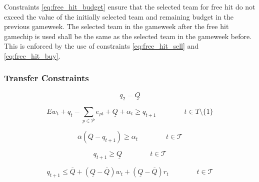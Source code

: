 Constraints \eqref{eq:free_hit_budget} ensure that the selected team for free hit do not exceed the value of the initially selected team and remaining budget in the previous gameweek. The selected team in the gameweek after the free hit gamechip is used shall be  the same as the selected team in the gameweek before. This is enforced by the use of constraints \eqref{eq:free_hit_sell} and \eqref{eq:free_hit_buy}. 

\subsubsection{Transfer Constraints} \label{cons:trans}

\begin{equation} \label{eq:trans_second_gw}
    q_{2} = \underline{Q}
\end{equation}

\begin{equation} \label{eq:trans_flow}
   E w_{t} + q_{t}-\sum_{p \in \mathcal{P}}e_{pt} + \underline{Q} + \alpha_{t} \geq q_{t+1} \qquad\qquad t \in T\setminus\{1\}
\end{equation}


\begin{equation} \label{eq:trans_flow_illegal_transfers}
    \bar{\alpha}(\overline{Q}-q_{t+1}) \geq \alpha_{t} \qquad\qquad t \in \mathcal{T}
\end{equation}

\begin{equation} \label{eq:trans_min}
    q_{t+1} \geq \underline{Q} \qquad\qquad t \in \mathcal{T}
\end{equation}

\begin{equation} \label{eq:trans_max}
    q_{t+1} \leq \overline{Q} + (\underline{Q}-\overline{Q})w_{t} + (\underline{Q}-\overline{Q})r_{t} \qquad\qquad t \in \mathcal{T}
\end{equation}

